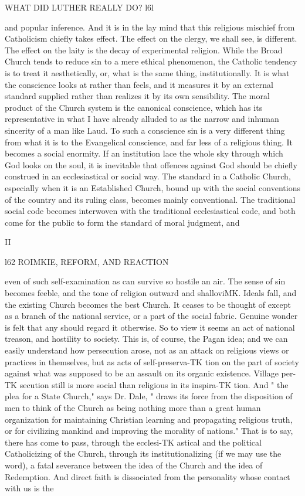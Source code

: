 \documentclass[12pt,a5paper,twoside]{book}
\begin{document}
{WHAT DID LUTHER REALLY DO? l6l 

and popular inference. And it is in the lay mind 
that this religious mischief from Catholicism chiefly 
takes effect. The effect on the clergy, we shall see, 
is different. The effect on the laity is the decay of 
experimental religion. While the Broad Church 
tends to reduce sin to a mere ethical phenomenon, 
the Catholic tendency is to treat it aesthetically, or, 
what is the same thing, institutionally. It is what the 
conscience looks at rather than feels, and it measures it 
by an external standard supplied rather than realizes 
it by its own sensibility. The moral product of the 
Church system is the canonical conscience, which has 
its representative in what I have already alluded to as 
the narrow and inhuman sincerity of a man like Laud. 
To such a conscience sin is a very different thing from 
what it is to the Evangelical conscience, and far less of 
a religious thing. It becomes a social enormity. If 
an institution lace the whole sky through which God 
looks on the soul, it is inevitable that offences against 
God should be chiefly construed in an ecclesiastical or 
social way. The standard in a Catholic Church, 
especially when it is an Established Church, bound 
up with the social conventions of the country and 
its ruling class, becomes mainly conventional. The 
traditional social code becomes interwoven with the 
traditional ecclesiastical code, and both come for the 
public to form the standard of moral judgment, and 

II 



l62 ROIMKIE, REFORM, AND REACTION 

even of such self-examination as can survive so hostile 
an air. The sense of sin becomes feeble, and the 
tone of religion outward and shalloviMK. Ideals fall, 
and the existing Church becomes the best Church. 
It ceases to be thought of except as a branch of 
the national service, or a part of the social fabric. 
Genuine wonder is felt that any should regard it 
otherwise. So to view it seems an act of national 
treason, and hostility to society. This is, of course, 
the Pagan idea; and we can easily understand how 
persecution arose, not as an attack on religious views 
or practices in themselves, but as acts of self-preserva-TK
tion on the part of society against what was supposed 
to be an assault on its organic existence. Village per-TK
secution still is more social than religious in its inspira-TK
tion. And " the plea for a State Church," says Dr. 
Dale, " draws its force from the disposition of men to 
think of the Church as being nothing more than a 
great human organization for maintaining Christian 
learning and propagating religious truth, or for civilizing 
mankind and improving the morality of nations." That 
is to say, there has come to pass, through the ecclesi-TK
astical and the political Catholicizing of the Church, 
through its institutionalizing (if we may use the word), 
a fatal severance between the idea of the Church and 
the idea of Redemption. And direct faith is dissociated 
from the personality whose contact with us is the 



}
\end{document}
